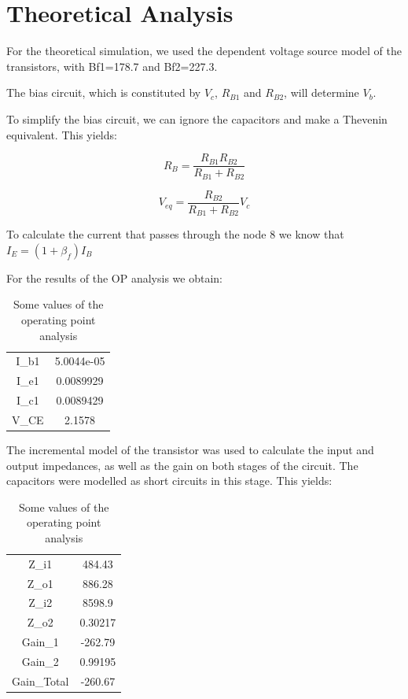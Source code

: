\section{Theoretical Analysis}
\label{sec:analysis}

For the theoretical simulation, we used the dependent voltage source model of the transistors, with Bf1=178.7 and Bf2=227.3.

The bias circuit, which is constituted by $V_c$, $R_{B1}$ and $R_{B2}$, will determine $V_b$.

To simplify the bias circuit, we can ignore the capacitors and make a Thevenin equivalent. This yields:

\begin{equation}
	R_B=\frac{R_{B1} R_{B2}}{R_{B1}+R_{B2}}
\end{equation}

\begin{equation}
	V_{eq}= \frac{R_{B2}}{R_{B1}+R_{B2}} V_{c}
\end{equation}

To calculate the current that passes through the node 8 we know that $I_E= (1+\beta_f)I_B$

For the results of the OP analysis we obtain:

\begin{table}[H]
    \addtolength{\tabcolsep}{-4pt}
    \caption{Some values of the operating point analysis}
    \vspace{-3mm}
    \begin{tabular}{|c|c|}
    \hline
    I_{b1} &  5.0044e-05\\
    I_{e1} &  0.0089929\\
    I_{c1} &  0.0089429  \\ 
    V_{CE} &  2.1578\\

    
    \hline
    \end{tabular}
    \label{tab:OP_mat}
\end{table}

The incremental model of the transistor was used to calculate the input and output impedances, as well as
the gain on both stages of the circuit. The capacitors were modelled as short circuits in this stage. This yields:

\begin{table}[H]
    \addtolength{\tabcolsep}{-4pt}
    \caption{Some values of the operating point analysis}
    \vspace{-3mm}
    \begin{tabular}{|c|c|}
    \hline
    Z_{i1} &  484.43\\
    Z_{o1} &  886.28\\
    Z_{i2} &  8598.9\\
    Z_{o2} &  0.30217\\
    Gain_1 & -262.79\\
    Gain_2 &  0.99195\\
    Gain_{Total} & -260.67\\   
    \hline
    \end{tabular}
    \label{tab:OP_mat}
\end{table}

